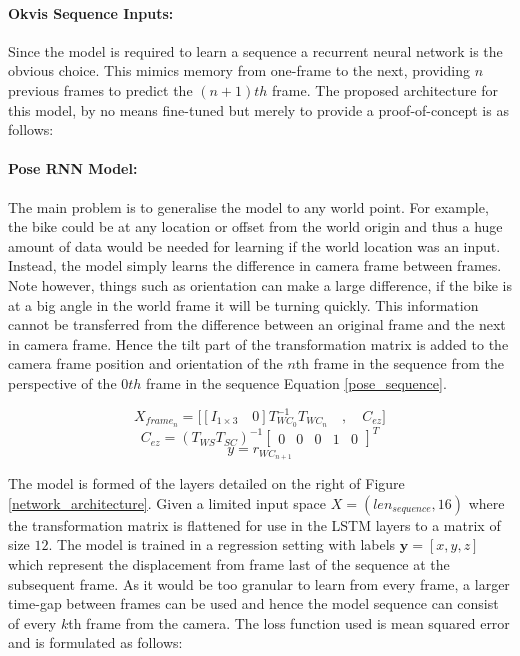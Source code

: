 \documentclass[11pt,twoside]{report}
\begin{document}
\paragraph{Okvis Sequence Inputs:}
Since the model is required to learn a sequence a recurrent neural network is the obvious choice. This mimics memory from one-frame to the next, providing $n$ previous frames to predict the $(n+1)th$ frame. The proposed architecture for this model, by no means fine-tuned but merely to provide a proof-of-concept is as follows:

\paragraph{Pose RNN Model:} \label{pose_model}
The main problem is to generalise the model to any world point. For example, the bike could be at any location or offset from the world origin and thus a huge amount of data would be needed for learning if the world location was an input. Instead, the model simply learns the difference in camera frame between frames. Note however, things such as orientation can make a large difference, if the bike is at a big angle in the world frame it will be turning quickly. This information cannot be transferred from the difference between an original frame and the next in camera frame. Hence the tilt part of the transformation matrix is added to the camera frame position and orientation of the $n$th frame in the sequence from the perspective of the $0th$ frame in the sequence Equation \ref{pose_sequence}.


\begin{equation}
X_{frame_{n}} = 
\bigg [ [I_{1 \times 3} \quad 0]T^{-1}_{WC_{0}}T_{WC_{n}} \quad , \quad C_{ez}\bigg ]
\end{equation}
\begin{equation}
C_{ez} = (T_{WS} T_{SC})^{-1}
\begin{bmatrix}
0 & 0 & 0 & 1 & 0
\end{bmatrix}^{T}
\end{equation}
\begin{equation}
y = r_{WC_{n+1}}
\label{pose_sequence}
\end{equation}

The model is formed of the layers detailed on the right of Figure \ref{network_architecture}. Given a limited input space $X = (len_{sequence}, 16)$ where the transformation matrix is flattened for use in the LSTM layers to a matrix of size $12$. The model is trained in a regression setting with labels $\mathbf{y}=[x,y,z]$ which represent the displacement from frame last of the sequence at the subsequent frame. As it would be too granular to learn from every frame, a larger time-gap between frames can be used and hence the model sequence can consist of every $k$th frame from the camera. The loss function used is mean squared error and is formulated as follows:
\end{document}
